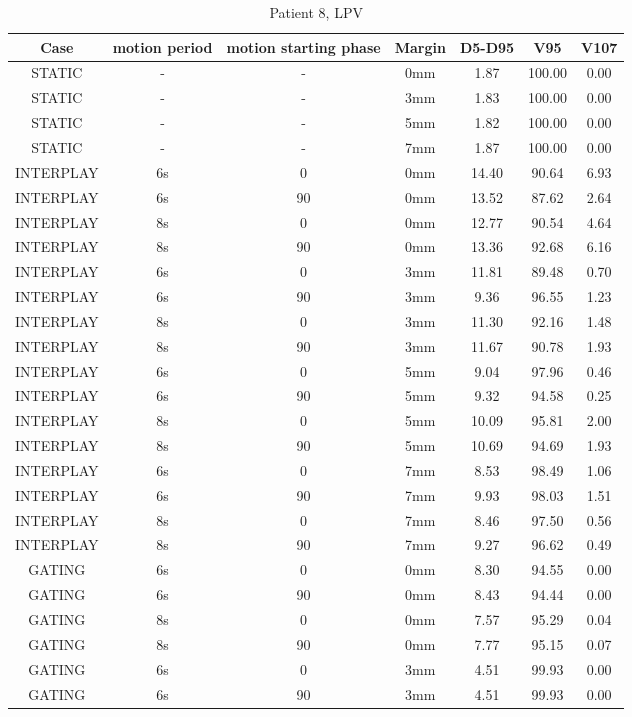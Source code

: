 \begin{table}[H]
  \centering
  \caption{Patient 8, LPV}
  \begin{tabular}{|c||c|c|c||c|c|c|}
    \hline\hline
    Case & motion period & motion starting phase & Margin & D5-D95 & V95 & V107\\
    \hline 
STATIC & - & - & 0mm & 1.87 & 100.00 & 0.00 \\
STATIC & - & - & 3mm & 1.83 & 100.00 & 0.00 \\
STATIC & - & - & 5mm & 1.82 & 100.00 & 0.00 \\
STATIC & - & - & 7mm & 1.87 & 100.00 & 0.00 \\
INTERPLAY & 6s & 0 & 0mm & 14.40 & 90.64 & 6.93 \\
INTERPLAY & 6s & 90 & 0mm & 13.52 & 87.62 & 2.64 \\
INTERPLAY & 8s & 0 & 0mm & 12.77 & 90.54 & 4.64 \\
INTERPLAY & 8s & 90 & 0mm & 13.36 & 92.68 & 6.16 \\
INTERPLAY & 6s & 0 & 3mm & 11.81 & 89.48 & 0.70 \\
INTERPLAY & 6s & 90 & 3mm & 9.36 & 96.55 & 1.23 \\
INTERPLAY & 8s & 0 & 3mm & 11.30 & 92.16 & 1.48 \\
INTERPLAY & 8s & 90 & 3mm & 11.67 & 90.78 & 1.93 \\
INTERPLAY & 6s & 0 & 5mm & 9.04 & 97.96 & 0.46 \\
INTERPLAY & 6s & 90 & 5mm & 9.32 & 94.58 & 0.25 \\
INTERPLAY & 8s & 0 & 5mm & 10.09 & 95.81 & 2.00 \\
INTERPLAY & 8s & 90 & 5mm & 10.69 & 94.69 & 1.93 \\
INTERPLAY & 6s & 0 & 7mm & 8.53 & 98.49 & 1.06 \\
INTERPLAY & 6s & 90 & 7mm & 9.93 & 98.03 & 1.51 \\
INTERPLAY & 8s & 0 & 7mm & 8.46 & 97.50 & 0.56 \\
INTERPLAY & 8s & 90 & 7mm & 9.27 & 96.62 & 0.49 \\
GATING & 6s & 0 & 0mm & 8.30 & 94.55 & 0.00 \\
GATING & 6s & 90 & 0mm & 8.43 & 94.44 & 0.00 \\
GATING & 8s & 0 & 0mm & 7.57 & 95.29 & 0.04 \\
GATING & 8s & 90 & 0mm & 7.77 & 95.15 & 0.07 \\
GATING & 6s & 0 & 3mm & 4.51 & 99.93 & 0.00 \\
GATING & 6s & 90 & 3mm & 4.51 & 99.93 & 0.00 \\

\end{tabular}
\end{table}
